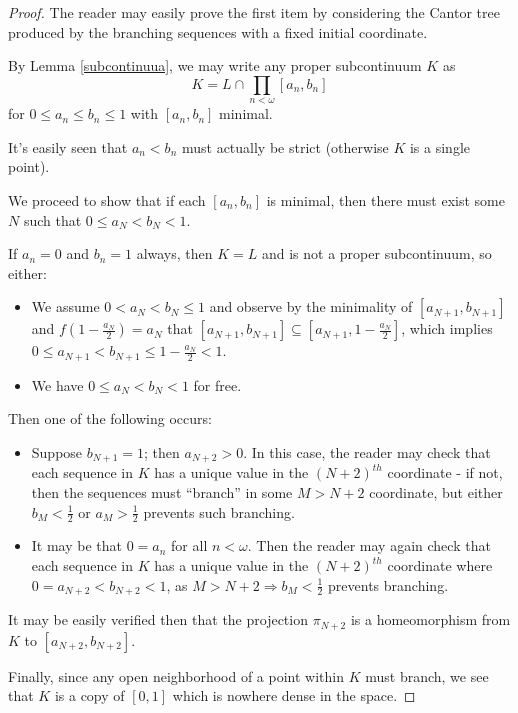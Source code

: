 \begin{proof}
The reader may easily prove the first item by considering the Cantor tree produced by the branching sequences with a fixed initial coordinate.

By Lemma \ref{subcontinuua}, we may write any proper subcontinuum $K$ as
  \[
    K = L \cap \prod_{n<\omega} [a_n,b_n] 
  \]
for $0\leq a_n \leq b_n \leq 1$ with $[a_n,b_n]$ minimal.

It's easily seen that $a_n < b_n$ must actually be strict (otherwise $K$ is a single point).

We proceed to show that if each $[a_n,b_n]$ is minimal, then there must exist some $N$ such that $0\leq a_N < b_N < 1$.

If $a_n=0$ and $b_n=1$ always, then $K=L$ and is not a proper subcontinuum, so either:
  \begin{itemize}
    \item We assume $0< a_N < b_N \leq 1$ and observe by the minimality of $[a_{N+1},b_{N+1}]$ and $f(1-\frac{a_N}{2})=a_N$ that $[a_{N+1},b_{N+1}]\subseteq[a_{N+1},1-\frac{a_N}{2}]$, which implies $0\leq a_{N+1} < b_{N+1} \leq 1 - \frac{a_N}{2} < 1$.
    \item We have $0\leq a_N < b_N < 1$ for free.
  \end{itemize}
Then one of the following occurs:
  \begin{itemize}
    \item Suppose $b_{N+1}=1$; then $a_{N+2}>0$. In this case, the reader may check that each sequence in $K$ has a unique value in the $(N+2)^{th}$ coordinate - if not, then the sequences must ``branch'' in some $M>N+2$ coordinate, but either $b_M<\frac{1}{2}$ or $a_M>\frac{1}{2}$ prevents such branching.
    \item It may be that $0=a_n$ for all $n<\omega$. Then the reader may again check that each sequence in $K$ has a unique value in the $(N+2)^{th}$ coordinate where $0=a_{N+2}<b_{N+2}<1$, as $M>N+2 \Rightarrow b_M<\frac{1}{2}$ prevents branching.
  \end{itemize}

It may be easily verified then that the projection $\pi_{N+2}$ is a homeomorphism from $K$ to $[a_{N+2},b_{N+2}]$.

Finally, since any open neighborhood of a point within $K$ must branch, we see that $K$ is a copy of $[0,1]$ which is nowhere dense in the space.
\end{proof}

